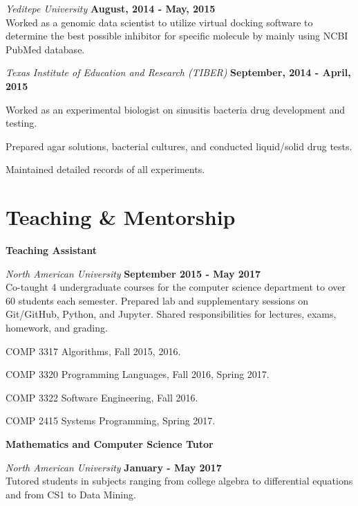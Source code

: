 \documentclass[margin,line]{res}
\begin{document}
\begin{resume}
{\em Yeditepe University} \hfill {\bf August, 2014 - May, 2015}\\
Worked as a genomic data scientist to utilize virtual docking software to determine the best possible inhibitor for specific molecule by mainly using NCBI PubMed database.

{\em Texas Institute of Education and Research (TIBER)} \hfill {\bf September, 2014 - April, 2015}\\
\begin{list2}
\item Worked as an experimental biologist on sinusitis bacteria drug development and testing.
\item Prepared agar solutions, bacterial cultures, and conducted liquid/solid drug tests.
\item Maintained detailed records of all experiments.
\end{list2}


\section{\sc Teaching \& Mentorship}

{\bf Teaching Assistant}

\vspace{-.3cm}
{\em North American University} \hfill {\bf September 2015 - May 2017}\\
Co-taught 4 undergraduate courses for the computer science department to over 60 students each semester. Prepared lab and supplementary sessions on Git/GitHub, Python, and Jupyter. Shared responsibilities for lectures, exams, homework, and grading.
\vspace*{.05in}
\begin{list2}
\item COMP 3317 Algorithms, Fall 2015, 2016.
\item COMP 3320 Programming Languages, Fall 2016, Spring 2017.
\item COMP 3322 Software Engineering, Fall 2016.
\item COMP 2415 Systems Programming, Spring 2017.
\end{list2}

{\bf Mathematics and Computer Science Tutor}
\vspace{-.1cm}

{\em North American University} \hfill {\bf January - May 2017}\\
Tutored students in subjects ranging from college algebra to differential equations and from CS1 to Data Mining.


\end{resume}
\end{document}
